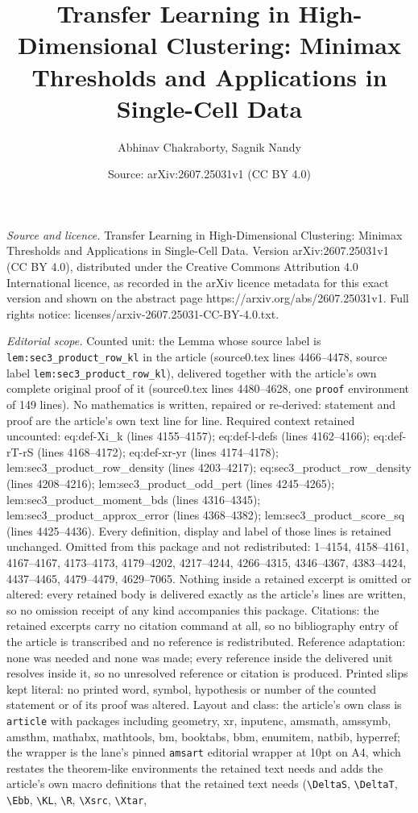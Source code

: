 \documentclass[10pt,a4paper]{amsart}
\title[Transfer Learning in High-Dimensional Clustering: Minimax Th]{Transfer Learning in High-Dimensional Clustering: Minimax Thresholds and Applications in Single-Cell Data}
\author{Abhinav Chakraborty, Sagnik Nandy}
\date{Source: arXiv:2607.25031v1 (CC BY 4.0)}
\begin{document}
\maketitle

\noindent\emph{Source and licence.} Transfer Learning in High-Dimensional Clustering: Minimax Thresholds and Applications in Single-Cell Data. Version arXiv:2607.25031v1 (CC BY 4.0), distributed under the Creative Commons Attribution 4.0 International licence, as recorded in the arXiv licence metadata for this exact version and shown on the abstract page https://arxiv.org/abs/2607.25031v1. Full rights notice: licenses/arxiv-2607.25031-CC-BY-4.0.txt.\par\smallskip

\noindent\textit{Editorial scope.} Counted unit: the Lemma whose source label is \texttt{lem:sec3\_product\_row\_kl} in the article (source0.tex lines 4466--4478, source label \texttt{lem:sec3\_product\_row\_kl}), delivered together with the article's own complete original proof of it (source0.tex lines 4480--4628, one \texttt{proof} environment of 149 lines). No mathematics is written, repaired or re-derived: statement and proof are the article's own text line for line. Required context retained uncounted: eq:def-Xi\_k (lines 4155--4157); eq:def-l-defs (lines 4162--4166); eq:def-rT-rS (lines 4168--4172); eq:def-xr-yr (lines 4174--4178); lem:sec3\_product\_row\_density (lines 4203--4217); eq:sec3\_product\_row\_density (lines 4208--4216); lem:sec3\_product\_odd\_pert (lines 4245--4265); lem:sec3\_product\_moment\_bds (lines 4316--4345); lem:sec3\_product\_approx\_error (lines 4368--4382); lem:sec3\_product\_score\_sq (lines 4425--4436). Every definition, display and label of those lines is retained unchanged. Omitted from this package and not redistributed: 1--4154, 4158--4161, 4167--4167, 4173--4173, 4179--4202, 4217--4244, 4266--4315, 4346--4367, 4383--4424, 4437--4465, 4479--4479, 4629--7065. Nothing inside a retained excerpt is omitted or altered: every retained body is delivered exactly as the article's lines are written, so no omission receipt of any kind accompanies this package. Citations: the retained excerpts carry no citation command at all, so no bibliography entry of the article is transcribed and no reference is redistributed. Reference adaptation: none was needed and none was made; every reference inside the delivered unit resolves inside it, so no unresolved reference or citation is produced. Printed slips kept literal: no printed word, symbol, hypothesis or number of the counted statement or of its proof was altered. Layout and class: the article's own class is \texttt{article} with packages including geometry, xr, inputenc, amsmath, amssymb, amsthm, mathabx, mathtools, bm, booktabs, bbm, enumitem, natbib, hyperref; the wrapper is the lane's pinned \texttt{amsart} editorial wrapper at 10pt on A4, which restates the theorem-like environments the retained text needs and adds the article's own macro definitions that the retained text needs (\texttt{\textbackslash DeltaS}, \texttt{\textbackslash DeltaT}, \texttt{\textbackslash Ebb}, \texttt{\textbackslash KL}, \texttt{\textbackslash R}, \texttt{\textbackslash Xsrc}, \texttt{\textbackslash Xtar}, 
\end{document}
